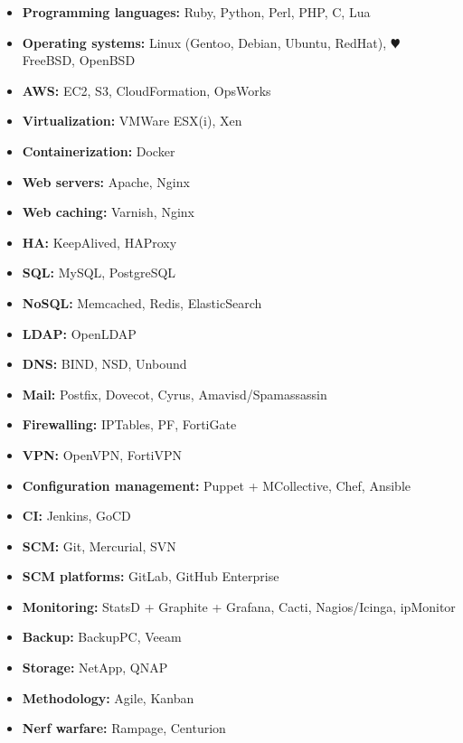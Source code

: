 \documentclass[]{friggeri-cv} %
\begin{document}
\begin{itemize}
  \item \textbf{Programming languages:} Ruby, Python, Perl, PHP, C, Lua
  \item \textbf{Operating systems:} Linux (Gentoo, Debian, Ubuntu, RedHat), {\color{red} $\varheartsuit$} FreeBSD, OpenBSD
  \item \textbf{AWS:} EC2, S3, CloudFormation, OpsWorks
  \item \textbf{Virtualization:} VMWare ESX(i), Xen
  \item \textbf{Containerization:} Docker
  \item \textbf{Web servers:} Apache, Nginx
  \item \textbf{Web caching:} Varnish, Nginx
  \item \textbf{HA:} KeepAlived, HAProxy
  \item \textbf{SQL:} MySQL, PostgreSQL
  \item \textbf{NoSQL:} Memcached, Redis, ElasticSearch
  \item \textbf{LDAP:} OpenLDAP
  \item \textbf{DNS:} BIND, NSD, Unbound
  \item \textbf{Mail:} Postfix, Dovecot, Cyrus, Amavisd/Spamassassin
  \item \textbf{Firewalling:} IPTables, PF, FortiGate
  \item \textbf{VPN:} OpenVPN, FortiVPN
  \item \textbf{Configuration management:} Puppet + MCollective, Chef, Ansible
  \item \textbf{CI:} Jenkins, GoCD
  \item \textbf{SCM:} Git, Mercurial, SVN
  \item \textbf{SCM platforms:} GitLab, GitHub Enterprise
  \item \textbf{Monitoring:} StatsD + Graphite + Grafana, Cacti, Nagios/Icinga, ipMonitor
  \item \textbf{Backup:} BackupPC, Veeam
  \item \textbf{Storage:} NetApp, QNAP
  \item \textbf{Methodology:} Agile, Kanban
  \item \textbf{Nerf warfare:} Rampage, Centurion
\end{itemize}

\end{document}
